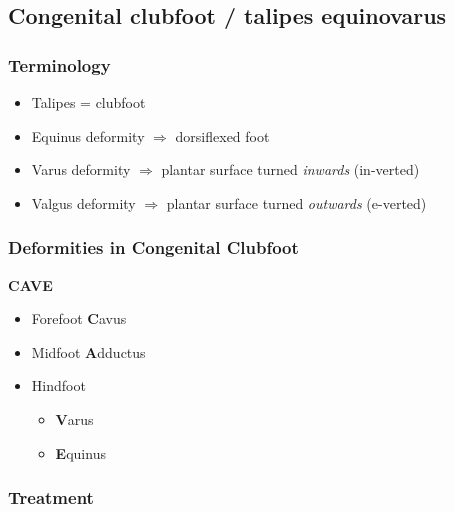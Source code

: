 \documentclass[
  14pt,
]{extarticle}
\providecommand{\tightlist}{%
  \setlength{\itemsep}{0pt}\setlength{\parskip}{0pt}}
\begin{document}
\pagebreak

\hypertarget{congenital-clubfoot-talipes-equinovarus}{%
\subsection{Congenital clubfoot / talipes
equinovarus}\label{congenital-clubfoot-talipes-equinovarus}}

\hypertarget{terminology}{%
\subsubsection{Terminology}\label{terminology}}

\begin{itemize}
\tightlist
\item
  Talipes = clubfoot
\item
  Equinus deformity \(\Rightarrow\) dorsiflexed foot
\item
  Varus deformity \(\Rightarrow\) plantar surface turned \emph{inwards}
  (in-verted)
\item
  Valgus deformity \(\Rightarrow\) plantar surface turned
  \emph{outwards} (e-verted)
\end{itemize}

\hypertarget{deformities-in-congenital-clubfoot}{%
\subsubsection{Deformities in Congenital
Clubfoot}\label{deformities-in-congenital-clubfoot}}

\textbf{CAVE}

\begin{itemize}
\tightlist
\item
  Forefoot \textbf{C}avus
\item
  Midfoot \textbf{A}dductus
\item
  Hindfoot

  \begin{itemize}
  \tightlist
  \item
    \textbf{V}arus
  \item
    \textbf{E}quinus
  \end{itemize}
\end{itemize}

\hypertarget{treatment-1}{%
\subsubsection{Treatment}\label{treatment-1}}
\end{document}
